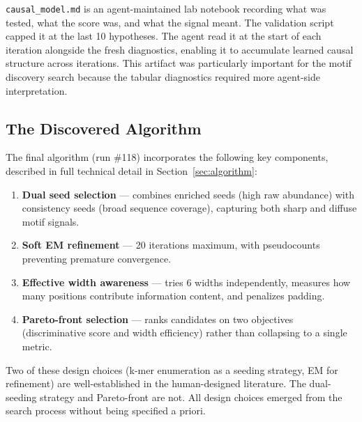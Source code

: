 \documentclass[11pt,a4paper]{article}
\begin{document}
\texttt{causal\_model.md} is an agent-maintained lab notebook recording what was tested, what the score was, and what the signal meant. The validation script capped it at the last 10 hypotheses. The agent read it at the start of each iteration alongside the fresh diagnostics, enabling it to accumulate learned causal structure across iterations. This artifact was particularly important for the motif discovery search because the tabular diagnostics required more agent-side interpretation.

\subsection{The Discovered Algorithm}

The final algorithm (run \#118) incorporates the following key components, described in full technical detail in Section~\ref{sec:algorithm}:

\begin{enumerate}
    \item \textbf{Dual seed selection} --- combines enriched seeds (high raw abundance) with consistency seeds (broad sequence coverage), capturing both sharp and diffuse motif signals.
    \item \textbf{Soft EM refinement} --- 20 iterations maximum, with pseudocounts preventing premature convergence.
    \item \textbf{Effective width awareness} --- tries 6 widths independently, measures how many positions contribute information content, and penalizes padding.
    \item \textbf{Pareto-front selection} --- ranks candidates on two objectives (discriminative score and width efficiency) rather than collapsing to a single metric.
\end{enumerate}

Two of these design choices (k-mer enumeration as a seeding strategy, EM for refinement) are well-established in the human-designed literature. The dual-seeding strategy and Pareto-front are not.  All design choices emerged from the search process without being specified a priori.

\end{document}
